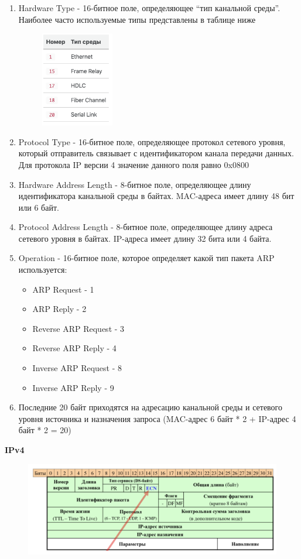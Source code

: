 \documentclass[12pt,onecolumn]{article}
\begin{document}
\begin{enumerate}
    \item {Hardware Type - 16-битное поле, определяющее “тип канальной среды”. Наиболее часто используемые типы представлены в таблице ниже
    \begin{figure}[H]
        \centering
        \includegraphics*[width=0.3\textwidth]{image/part10/arp-tab1.png}
    \end{figure}
    }
    \item Protocol Type - 16-битное поле, определяющее протокол сетевого уровня, который отправитель связывает с идентификатором канала передачи данных. Для протокола IP версии 4 значение данного поля равно 0x0800
    \item Hardware Address Length - 8-битное поле, определяющее длину идентификатора канальной среды в байтах. MAC-адреса имеет длину 48 бит или 6 байт.
    \item Protocol Address Length - 8-битное поле, определяющее длину адреса сетевого уровня в байтах. IP-адреса имеет длину 32 бита или 4 байта.
    \item {Operation - 16-битное поле, которое определяет какой тип пакета ARP используется:
    \begin{itemize}
        \item ARP Request - 1
        \item ARP Reply - 2
        \item Reverse ARP Request - 3
        \item Reverse ARP Reply - 4
        \item Inverse ARP Request - 8
        \item Inverse ARP Reply - 9
    \end{itemize}
    }
    \item Последние 20 байт приходятся на адресацию канальной среды и сетевого уровня источника и назначения запроса (MAC-адрес 6 байт * 2 + IP-адрес 4 байт * 2 = 20)
\end{enumerate}
\textbf{IPv4}
\begin{figure}[H]
    \centering
    \includegraphics*[width=\textwidth]{image/part10/ip4.png}
\end{figure}
\end{document}
